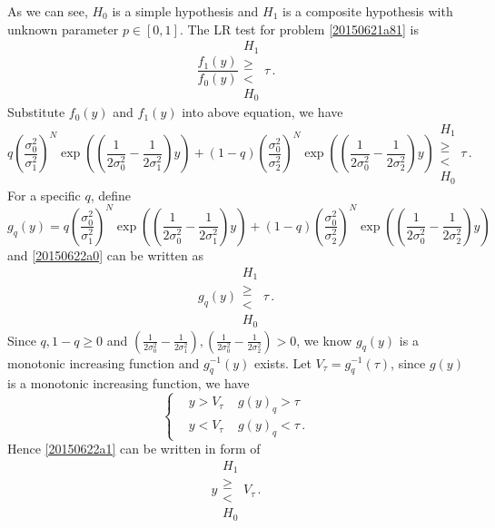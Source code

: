 As we can see, $H_0$ is a simple hypothesis and $H_1$ is a composite hypothesis with unknown parameter $p \in [0, 1]$. 
The LR test for problem  \eqref{20150621a81} is
\begin{equation}
  \frac{f_1(y)}{f_0(y)} \substack{H_1 \\ \geq \\ < \\ H_0} \tau\,.
\end{equation}
Substitute $f_0(y)$ and $f_1(y)$ into above equation, we have 
\begin{equation}
  q\left(\frac{\sigma_0^2}{\sigma_1^2}\right)^N\exp\left( (\frac{1}{2\sigma_0^2} -  \frac{1}{2\sigma_1^2}  )y \right)
+ (1-q) \left(\frac{\sigma_0^2}{\sigma_2^2}\right)^N\exp\left( (\frac{1}{2\sigma_0^2} -  \frac{1}{2\sigma_2^2}  )y \right)
\substack{H_1 \\ \geq \\ < \\ H_0} \tau\,.
\label{20150622a0}
\end{equation}
For a specific $q$, define 
\begin{equation}
  g_q(y) = q\left(\frac{\sigma_0^2}{\sigma_1^2}\right)^N\exp\left( (\frac{1}{2\sigma_0^2} -  \frac{1}{2\sigma_1^2}  )y \right)
+ (1-q) \left(\frac{\sigma_0^2}{\sigma_2^2}\right)^N\exp\left( (\frac{1}{2\sigma_0^2} -  \frac{1}{2\sigma_2^2}  )y \right)\,
\end{equation}
and \eqref{20150622a0} can be written as
\begin{equation}
  g_q(y) \substack{H_1 \\ \geq \\ < \\ H_0} \tau\,.
  \label{20150622a1}
\end{equation}
Since $q, 1-q \geq 0$ and $(\frac{1}{2\sigma_0^2} -  \frac{1}{2\sigma_1^2}  ), (\frac{1}{2\sigma_0^2} -  \frac{1}{2\sigma_2^2}  ) >  0$, we know $g_q(y)$ is a monotonic increasing function and $g^{-1}_q(y) $ exists.  
Let $V_\tau = g^{-1}_q(\tau)$, since $g(y)$ is a monotonic increasing function, we have 
\begin{equation}
  \begin{cases}
    &y > V_\tau\;\;\;\;g(y)_q > \tau\\
    &y < V_\tau\;\;\;\;g(y)_q < \tau\,.
  \end{cases}
\end{equation}
Hence \eqref{20150622a1} can be written in form of 
\begin{equation}
  y  \substack{H_1 \\ \geq \\ < \\ H_0} V_\tau\,.
  \label{20150622a2}
\end{equation}

